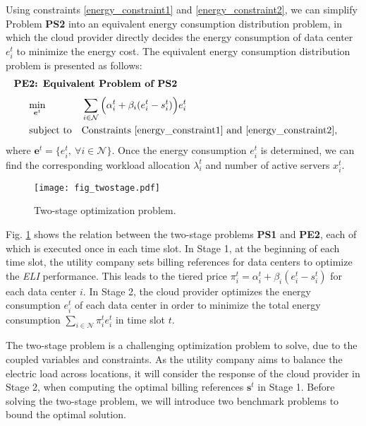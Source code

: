 \documentclass[journal]{IEEEtran}
\begin{document}
	Using constraints \eqref{energy_constraint1} and \eqref{energy_constraint2}, we can simplify Problem \textbf{PS2} into an equivalent energy consumption distribution problem, in which the cloud provider directly decides the energy consumption of data center $e_i^t$ to minimize the energy cost. The equivalent energy consumption distribution problem is presented as follows:
    \begin{align*}
	\leftline{\textbf{PE2: Equivalent Problem of PS2}}
	\end{align*}
	\begin{equation*}
	\begin{aligned}
	& \underset{\boldsymbol{e}^{t}} {\min}
	& & \sum_{i \in \mathcal{N}} 
	\Big( \alpha_{i}^{t} +\beta_{i} (e_{i}^{t}-s_{i}^{t}) \Big) e_{i}^{t} \\
	& \text{subject to}
	& & \text{Constraints \eqref{energy_constraint1} and \eqref{energy_constraint2}},
	\end{aligned}
	\end{equation*}
	where $\boldsymbol{e}^{t}= \{ e_i^t,~\forall i \in \mathcal{N} \}$. Once the energy consumption $e_i^t$ is determined, we can find the corresponding workload allocation $\lambda_i^t$ and number of active servers $x_i^t$.
		
	\begin{figure}[t]
		\centering
		\texttt{[image: fig\_twostage.pdf]}
		\caption{\label{fig_twostage}Two-stage optimization problem.}
\end{figure}	
	Fig. \ref{fig_twostage} shows the relation between the two-stage problems \textbf{PS1} and \textbf{PE2}, each of which is executed once in each time slot. In Stage 1, at the beginning of each time slot, the utility company sets billing references for data centers to optimize the \emph{ELI} performance. This leads to the tiered price $\pi_i^t = \alpha_i^t + \beta_i (e_i^t -s_i^t)$ for each data center $i$. In Stage 2, the cloud provider optimizes the energy consumption $e_i^t$ of each data center in order to minimize the total energy consumption $\sum_{i\in\mathcal{N}} \pi_i^t e_i^t$ in time slot $t$.
		
	The two-stage problem is a challenging optimization problem to solve, due to the coupled variables and constraints. As the utility company aims to balance the electric load across locations, it will consider the response of the cloud provider in Stage 2, when computing the optimal billing references $\boldsymbol{s}^t$ in Stage 1. Before solving the two-stage problem, we will introduce two benchmark problems to bound the optimal solution. 
		
\end{document}

